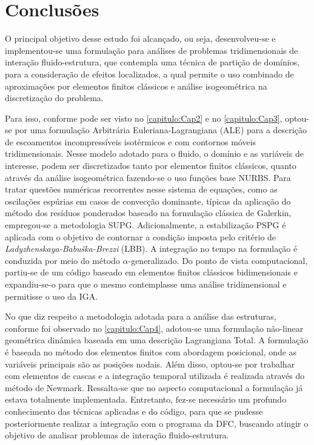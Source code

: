 \chapter{Conclusões} 

O principal objetivo desse estudo foi alcançado, ou seja, desenvolveu-se e implementou-se uma formulação
para análises de problemas tridimensionais de interação fluido-estrutura, que contempla uma técnica de 
partição de domínios, para a consideração de efeitos localizados, a qual permite o uso combinado de aproximações por elementos finitos clássicos
e análise isogeométrica na discretização do problema.

Para isso, conforme pode ser visto no \autoref{capitulo:Cap2} e no \autoref{capitulo:Cap3}, optou-se por uma formulação Arbitrária Euleriana-Lagrangiana (ALE) para a descrição de escoamentos incompressíveis isotérmicos e com contornos móveis tridimensionais. Nesse modelo adotado para o fluido, o domínio e as variáveis de interesse, podem ser discretizados tanto por elementos finitos clássicos, quanto através da análise isogeométrica fazendo-se o uso funções base NURBS. Para tratar questões numéricas recorrentes nesse sistema de equações, como as oscilações espúrias em casos de convecção dominante, típicas da aplicação do método dos resíduos ponderados baseado na formulação clássica de Galerkin, empregou-se a metodologia SUPG. Adicionalmente, a estabilização PSPG é aplicada com o objetivo de contornar a condição imposta pelo critério de \textit{Ladyzhenskaya-Babuška-Brezzi} (LBB). A integração no tempo na formulação é conduzida por meio do método $\alpha$-generalizado. Do ponto de vista computacional, partiu-se de um código baseado em elementos finitos clássicos bidimensionais e expandiu-se-o para que o mesmo contemplasse uma análise tridimensional e permitisse o uso da IGA.  

No que diz respeito a metodologia adotada para a análise das estruturas, conforme foi observado no \autoref{capitulo:Cap4}, adotou-se uma formulação não-linear geométrica dinâmica baseada em uma descrição Lagrangiana Total. A formulação é baseada no método dos elementos finitos com abordagem posicional, onde as variáveis principais são as posições nodais. Além disso, optou-se por trabalhar com elementos de cascas e a integração temporal utilizada é realizada através do método de Newmark. Ressalta-se que no aspecto computacional a formulação já estava totalmente implementada. Entretanto, fez-se necessário um profundo conhecimento das técnicas aplicadas e do código, para que se pudesse posteriormente realizar a integração com o programa da DFC, buscando atingir o objetivo de analisar problemas de interação fluido-estrutura.

